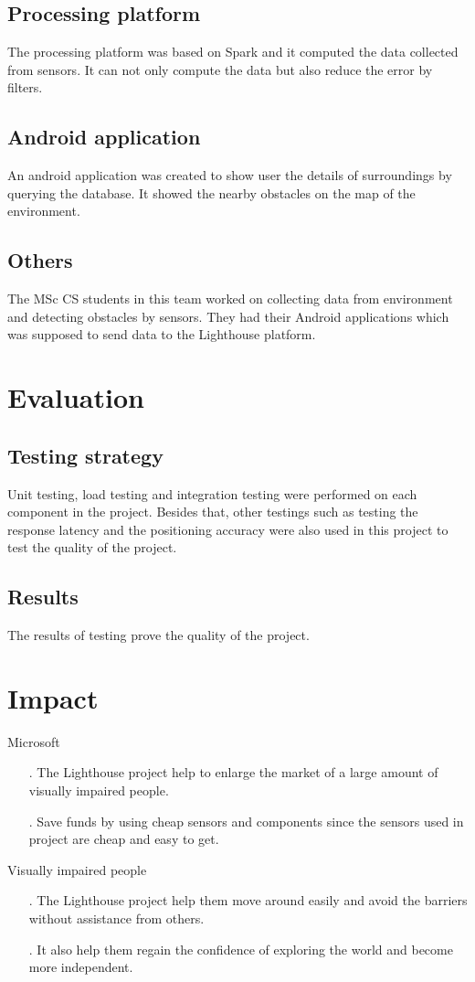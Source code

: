 \documentclass[prodmode,acmtosem]{acmsmall} %
\begin{document}
\subsection{Processing platform}
The processing platform was based on Spark and it computed the data collected from sensors. It can not only compute the data but also reduce the error by filters.
\subsection{Android application}
An android application was created to show user the details of surroundings by querying the database. It showed the nearby obstacles on the map of the environment.
\subsection{Others}
The MSc CS students in this team worked on collecting data from environment and detecting obstacles by sensors. They had their Android applications which was supposed to send data to the Lighthouse platform.
\section{Evaluation}
\subsection{Testing strategy}
Unit testing, load testing and integration testing were performed on each component in the project. Besides that, other testings such as testing the response latency and the positioning accuracy were also used in this project to test the quality of the project.
\subsection{Results}
The results of testing prove the quality of the project. 
\section{Impact}
Microsoft
\begin{itemize}
\item[.] The Lighthouse project help to enlarge the market of a large amount of visually impaired people.\\
\item[.] Save funds by using cheap sensors and components since the sensors used in project are cheap and easy to get.
\end{itemize}
Visually impaired people
\begin{itemize}
\item[.] The Lighthouse project help them move around easily and avoid the barriers without assistance from others.\\
\item[.] It also help them regain the confidence of exploring the world and become more independent.
\end{itemize}
\end{document}
